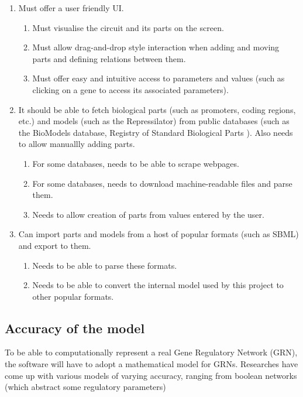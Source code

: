 \documentclass{article}
\begin{document}
\begin{enumerate}
		\item Must offer a user friendly UI.
		\begin{enumerate}
			\item Must visualise the circuit and its parts on the screen.
			\item Must allow drag-and-drop style interaction when adding and moving parts and defining relations between them.
			\item Must offer easy and intuitive access to parameters and values (such as clicking on a gene to access its associated parameters).
		\end{enumerate}
		
		\item It should be able to fetch biological parts (such as promoters, coding regions, etc.) and models (such as the Repressilator) from public databases (such as the BioModels\cite{biomodels} database, Registry of Standard Biological Parts \cite{rsbp}). Also needs to allow manuallly adding parts.
		\begin{enumerate}
			\item For some databases, needs to be able to scrape webpages.
			\item For some databases, needs to download machine-readable files and parse them.
			\item Needs to allow creation of parts from values entered by the user.
		\end{enumerate}
		
		\item Can import parts and models from a host of popular formats (such as SBML) and export to them.
		\begin{enumerate}
			\item Needs to be able to parse these formats.
			\item Needs to be able to convert the internal model used by this project to other popular formats.
		\end{enumerate}
		
	\end{enumerate}
	
	\subsection{Accuracy of the model}
	\par To be able to computationally represent a real Gene Regulatory Network (GRN), the software will have to adopt a mathematical model for GRNs. Researches have come up with various models of varying accuracy, ranging from boolean networks (which abstract some regulatory parameters) 
	
\end{document}
